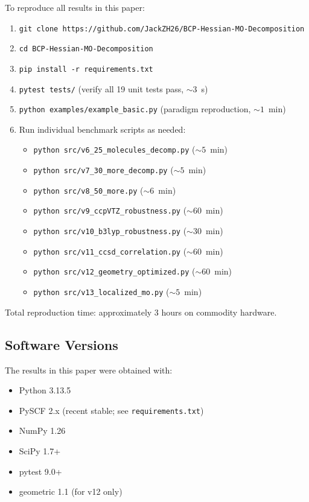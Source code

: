 \documentclass[11pt,a4paper]{article}
\begin{document}
To reproduce all results in this paper:
\begin{enumerate}
\item \texttt{git clone https://github.com/JackZH26/BCP-Hessian-MO-Decomposition}
\item \texttt{cd BCP-Hessian-MO-Decomposition}
\item \texttt{pip install -r requirements.txt}
\item \texttt{pytest tests/} (verify all 19 unit tests pass, $\sim 3$~s)
\item \texttt{python examples/example\_basic.py} (paradigm reproduction, $\sim 1$~min)
\item Run individual benchmark scripts as needed:
\begin{itemize}
\item \texttt{python src/v6\_25\_molecules\_decomp.py} ($\sim 5$~min)
\item \texttt{python src/v7\_30\_more\_decomp.py} ($\sim 5$~min)
\item \texttt{python src/v8\_50\_more.py} ($\sim 6$~min)
\item \texttt{python src/v9\_ccpVTZ\_robustness.py} ($\sim 60$~min)
\item \texttt{python src/v10\_b3lyp\_robustness.py} ($\sim 30$~min)
\item \texttt{python src/v11\_ccsd\_correlation.py} ($\sim 60$~min)
\item \texttt{python src/v12\_geometry\_optimized.py} ($\sim 60$~min)
\item \texttt{python src/v13\_localized\_mo.py} ($\sim 5$~min)
\end{itemize}
\end{enumerate}

Total reproduction time: approximately 3 hours on commodity hardware.

\subsection{Software Versions}

The results in this paper were obtained with:
\begin{itemize}
\item Python 3.13.5
\item PySCF 2.x (recent stable; see \texttt{requirements.txt})
\item NumPy 1.26
\item SciPy 1.7+
\item pytest 9.0+
\item geometric 1.1 (for v12 only)
\end{itemize}
\end{document}
